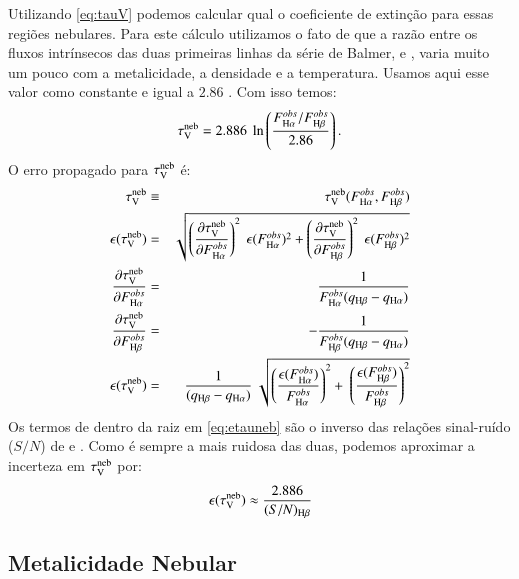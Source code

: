 Utilizando \eqref{eq:tauV} podemos calcular qual o coeficiente de extinção para essas regiões
nebulares. Para este cálculo utilizamos o fato de que a razão entre os fluxos intrínsecos das duas
primeiras linhas da série de Balmer, \Halpha e \Hbeta, varia muito um pouco com a metalicidade, a
densidade e a temperatura. Usamos aqui esse valor como constante e igual a $2.86$
\citep[densidade eletrônica de $n = 100\ cm^{-3}$ e temperatura eletrônica $T_e = 10^4$ K;
][]{Osterbrock.Ferland.2006a}.
Com isso temos:
\begin{equation}
	\tauVN = 2.886\ \ln \left( \frac{F_{\Halpha}^{obs}/F_{\Hbeta}^{obs}}{2.86} \right).
\end{equation}
O erro propagado para $\tau_{\mathrm{V}}^{\mathrm{neb}}$ é:
\begin{eqnarray}
	\tauVN &\equiv& \tauVN(F_{\Halpha}^{obs}, F_{\Hbeta}^{obs}) \\
	\epsilon (\tauVN) &=& \sqrt{\left(\del{\tauVN}{F_{\Halpha}^{obs}}\right)^2 \
\epsilon (F_{\Halpha}^{obs})^2 + \left(\del{\tauVN}{F_{\Hbeta}^{obs}}\right)^2 \
\epsilon (F_{\Hbeta}^{obs})^2 } \\
	\del{\tauVN}{F_{\Halpha}^{obs}} &=& \frac{1}{F_{\Halpha}^{obs} (q_{\Hbeta} - q_{\Halpha})} \\
	\del{\tauVN}{F_{\Hbeta}^{obs}} &=& - \frac{1}{F_{\Hbeta}^{obs} (q_{\Hbeta} - q_{\Halpha})} \\
	\epsilon (\tauVN) &=& \frac{1}{(q_{\Hbeta} - q_{\Halpha})} \
\sqrt{\left(\frac{\epsilon (F_{\Halpha}^{obs})}{F_{\Halpha}^{obs}}\right)^2 + \
\left(\frac{\epsilon (F_{\Hbeta}^{obs})}{F_{\Hbeta}^{obs}}\right)^2 }
	\label{eq:etauneb}
\end{eqnarray}
\noindent Os termos de dentro da raiz em \eqref{eq:etauneb} são o inverso das relações sinal-ruído
($S/N$) de \Halpha e \Hbeta. Como \Hbeta é sempre a mais ruidosa das duas, podemos aproximar a
incerteza em $\tau_{\mathrm{V}}^{\mathrm{neb}}$ por:
\begin{equation}
	\epsilon (\tauVN) \approx \frac{2.886}{(S/N)_{\Hbeta}}
	\label{eq:etaunebaprox}
\end{equation}

\subsection{Metalicidade Nebular}
\label{sec:emline:datacube:Zneb}

